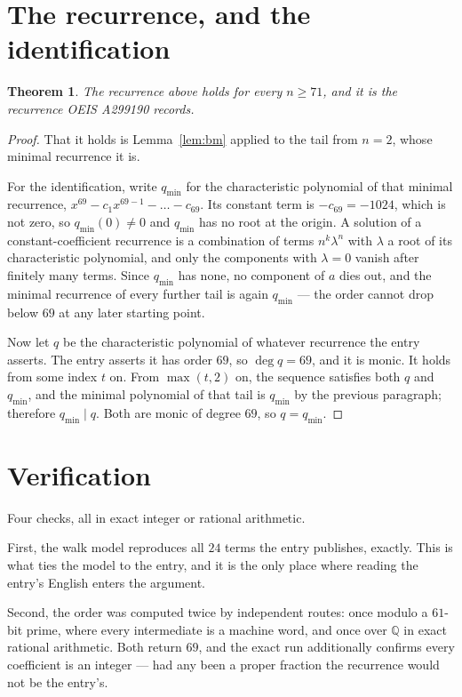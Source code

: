 \documentclass[11pt,a4paper]{article}
\theoremstyle{plain}
\newtheorem{theorem}{Theorem}
\theoremstyle{definition}
\begin{document}
\section{The recurrence, and the identification}

\begin{theorem}
The recurrence above holds for every $n\ge71$, and it is the recurrence OEIS A299190 records.
\end{theorem}

\begin{proof}
That it holds is Lemma~\ref{lem:bm} applied to the tail from $n=2$, whose minimal
recurrence it is.

For the identification, write $q_{\min}$ for the characteristic polynomial of that minimal
recurrence, $x^{69}-c_1x^{69-1}-\dots-c_{69}$. Its constant term is
$-c_{69}=-1024$, which is not zero, so $q_{\min}(0)\neq0$ and $q_{\min}$ has no
root at the origin. A solution of a constant-coefficient recurrence is a combination of terms
$n^{k}\lambda^{n}$ with $\lambda$ a root of its characteristic polynomial, and only the
components with $\lambda=0$ vanish after finitely many terms. Since $q_{\min}$ has none, no
component of $a$ dies out, and the minimal recurrence of every further tail is again
$q_{\min}$ --- the order cannot drop below $69$ at any later starting point.

Now let $q$ be the characteristic polynomial of whatever recurrence the entry asserts. The
entry asserts it has order $69$, so $\deg q=69$, and it is monic. It holds from some
index $t$ on. From $\max(t,2)$ on, the sequence satisfies both $q$ and $q_{\min}$, and
the minimal polynomial of that tail is $q_{\min}$ by the previous paragraph; therefore
$q_{\min}\mid q$. Both are monic of degree $69$, so $q=q_{\min}$.
\end{proof}

\section{Verification}

Four checks, all in exact integer or rational arithmetic.

First, the walk model reproduces all $24$ terms the entry publishes, exactly. This is
what ties the model to the entry, and it is the only place where reading the entry's English
enters the argument.

Second, the order was computed twice by independent routes: once modulo a $61$-bit prime, where
every intermediate is a machine word, and once over $\mathbb{Q}$ in exact rational arithmetic.
Both return $69$, and the exact run additionally confirms every coefficient is an integer
--- had any been a proper fraction the recurrence would not be the entry's.
\end{document}
